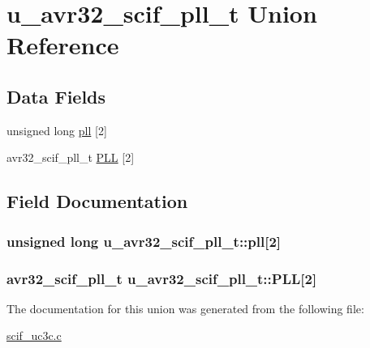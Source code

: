 \hypertarget{unionu__avr32__scif__pll__t}{
\section{u\-\_\-avr32\-\_\-scif\-\_\-pll\-\_\-t \-Union \-Reference}
\label{unionu__avr32__scif__pll__t}
}
\subsection*{\-Data \-Fields}
\begin{DoxyCompactItemize}
\item 
unsigned long \hyperlink{unionu__avr32__scif__pll__t_ace0e01d815be355b6a5614bf12cb6806}{pll} \mbox{[}2\mbox{]}
\item 
avr32\-\_\-scif\-\_\-pll\-\_\-t \hyperlink{unionu__avr32__scif__pll__t_ae4b06442c68ab961ebd544fb12b7018e}{\-P\-L\-L} \mbox{[}2\mbox{]}
\end{DoxyCompactItemize}


\subsection{\-Field \-Documentation}
\hypertarget{unionu__avr32__scif__pll__t_ace0e01d815be355b6a5614bf12cb6806}{
\subsubsection[{pll}]{\setlength{\rightskip}{0pt plus 5cm}unsigned long {\bf u\-\_\-avr32\-\_\-scif\-\_\-pll\-\_\-t\-::pll}\mbox{[}2\mbox{]}}}
\label{unionu__avr32__scif__pll__t_ace0e01d815be355b6a5614bf12cb6806}
\hypertarget{unionu__avr32__scif__pll__t_ae4b06442c68ab961ebd544fb12b7018e}{
\subsubsection[{\-P\-L\-L}]{\setlength{\rightskip}{0pt plus 5cm}avr32\-\_\-scif\-\_\-pll\-\_\-t {\bf u\-\_\-avr32\-\_\-scif\-\_\-pll\-\_\-t\-::\-P\-L\-L}\mbox{[}2\mbox{]}}}
\label{unionu__avr32__scif__pll__t_ae4b06442c68ab961ebd544fb12b7018e}


\-The documentation for this union was generated from the following file\-:\begin{DoxyCompactItemize}
\item 
\hyperlink{scif__uc3c_8c}{scif\-\_\-uc3c.\-c}\end{DoxyCompactItemize}
